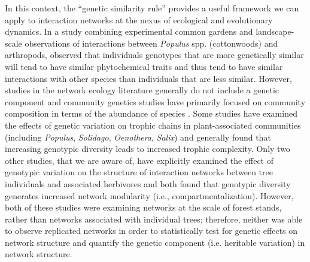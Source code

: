 \documentclass[fleqn,12pt]{olplainarticle}
\begin{document}
In this context, the ``genetic similarity rule'' provides a useful
framework we can apply to interaction networks at the nexus of
ecological and evolutionary dynamics. In a study combining
experimental common gardens and landscape-scale observations of
interactions between \textit{Populus} spp.  (cottonwoods) and
arthropods, \citep{Bangert2006} observed that individuals genotypes
that are more genetically similar will tend to have similar
phytochemical traits and thus tend to have similar interactions with
other species than individuals that are less similar. However, studies
in the network ecology literature generally do not include a genetic
component \cite{Lau2017a} and community genetics studies have
primarily focused on community composition in terms of the abundance
of species \cite{DesRoches2018TheVariation}. Some studies have
examined the effects of genetic variation on trophic chains in
plant-associated communities (including \textit{Populus},
\textit{Solidago}, \textit{Oenothera}, \textit{Salix})
\cite{Bailey2005ImportanceInteractions, Johnson2008, Smith2011,
  Smith2015b, Barbour2016GeneticComplexity} and generally found that
increasing genotypic diversity leads to increased trophic
complexity. Only two other studies, that we are aware of, have
explicitly examined the effect of genotypic variation on the structure
of interaction networks between tree individuals and associated
herbivores \cite{Lau2015a, Keith2017} and both found that genotypic
diversity generates increased network modularity (i.e.,
compartmentalization).  However, both of these studies were examining
networks at the scale of forest stands, rather than networks
associated with individual trees; therefore, neither was able to
observe replicated networks in order to statistically test for genetic
effects on network structure and quantify the genetic component
(i.e. heritable variation) in network structure.
\end{document}
